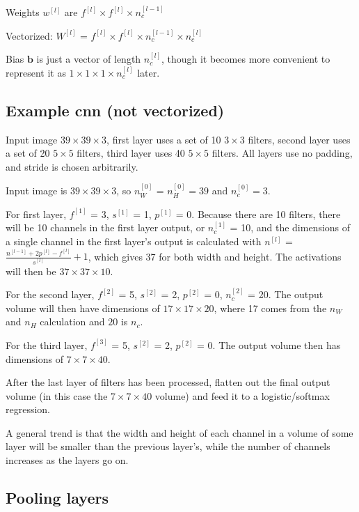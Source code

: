 \documentclass[12pt]{article}
\begin{document}
Weights $w^{[l]}$ are $f^{[l]} \times f^{[l]} \times n_c^{[l-1]}$

Vectorized: $W^{[l]}$ = $f^{[l]} \times f^{[l]} \times n_c^{[l-1]} \times n_c^{[l]}$

Bias $\bm b$ is just a vector of length $n_c^{[l]}$, though it becomes more convenient
to represent it as $1 \times 1 \times 1 \times n_c^{[l]}$ later.

\subsection{Example cnn (not vectorized)}

Input image $39 \times 39 \times 3$, first layer uses a set of 10 $3 \times 3$ filters,
second layer uses a set of 20 $5 \times 5$ filters, third layer uses 40 $5 \times 5$
filters. All layers use no padding, and stride is chosen arbitrarily.

Input image is $39 \times 39 \times 3$, so $n_W^{[0]}$ = $n_H^{[0]} = 39$
and $n_c^{[0]} = 3$.

For first layer, $f^{[1]}$ = 3, $s^{[1]}$ = 1, $p^{[1]}$ = 0. Because there are 10 filters,
there will be 10 channels in the first layer output, or $n_c^{[1]}$ = 10, and the dimensions
of a single channel in the first layer's output is calculated with $n^{[l]}$ =
$\frac{n^{[l-1]}+2p^{[l]}-f^{[l]}}{s^{[l]}} + 1$, which gives 37 for both width and height.
The activations will then be $37 \times 37 \times 10$.

For the second layer, $f^{[2]}$ = 5, $s^{[2]}$ = 2, $p^{[2]}$ = 0, $n_c^{[2]}$ = 20. The
output volume will then have dimensions of $17 \times 17 \times 20$, where 17 comes from
the $n_W$ and $n_H$ calculation and $20$ is $n_c$.

For the third layer, $f^{[3]}$ = 5, $s^{[2]}$ = 2, $p^{[2]}$ = 0. The output volume
then has dimensions of $7 \times 7 \times 40$.

After the last layer of filters has been processed, flatten out the final output volume
(in this case the $7 \times 7 \times 40$ volume) and feed it to a logistic/softmax regression.

A general trend is that the width and height of each channel in a volume of some layer will
be smaller than the previous layer's, while the number of channels increases as the layers go on.

\subsection{Pooling layers}
\end{document}
